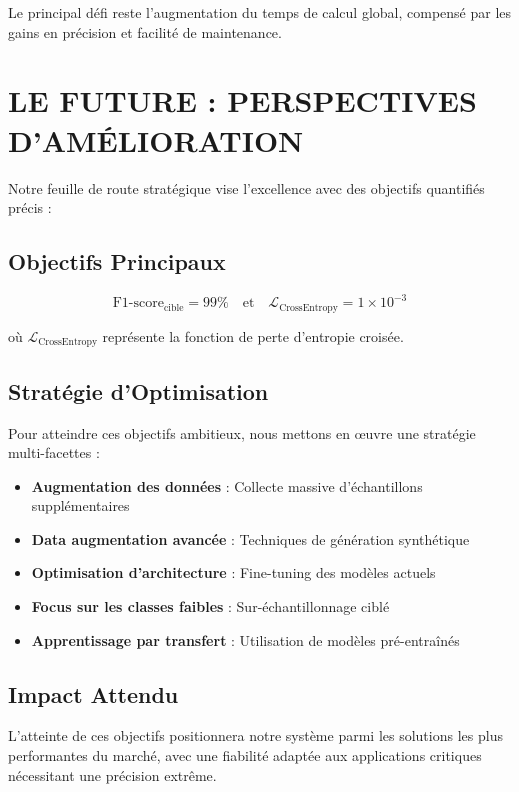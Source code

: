 \documentclass[letterpaper, 10 pt, conference]{ieeeconf}  %
\begin{document}
Le principal défi reste l'augmentation du temps de calcul global, compensé par les gains en précision et facilité de maintenance.

\section{LE FUTURE : PERSPECTIVES D'AMÉLIORATION}

Notre feuille de route stratégique vise l'excellence avec des objectifs quantifiés précis :

\subsection{Objectifs Principaux}

\begin{equation}
\text{F1-score}_{\text{cible}} = 99\% \quad \text{et} \quad \mathcal{L}_{\text{CrossEntropy}} = 1 \times 10^{-3}
\end{equation}

où $\mathcal{L}_{\text{CrossEntropy}}$ représente la fonction de perte d'entropie croisée.

\subsection{Stratégie d'Optimisation}

Pour atteindre ces objectifs ambitieux, nous mettons en œuvre une stratégie multi-facettes :

\begin{itemize}
\item \textbf{Augmentation des données} : Collecte massive d'échantillons supplémentaires
\item \textbf{Data augmentation avancée} : Techniques de génération synthétique
\item \textbf{Optimisation d'architecture} : Fine-tuning des modèles actuels
\item \textbf{Focus sur les classes faibles} : Sur-échantillonnage ciblé
\item \textbf{Apprentissage par transfert} : Utilisation de modèles pré-entraînés
\end{itemize}

\subsection{Impact Attendu}

L'atteinte de ces objectifs positionnera notre système parmi les solutions les plus performantes du marché, avec une fiabilité adaptée aux applications critiques nécessitant une précision extrême.
\end{document}
